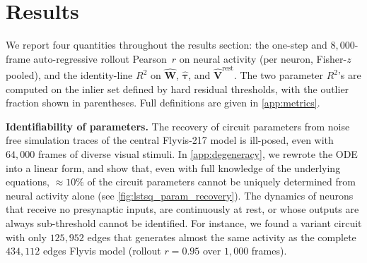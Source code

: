 \documentclass{article}
\begin{document}
\section{Results}



We report four quantities throughout the results section: the one-step and
$8{,}000$-frame auto-regressive rollout Pearson~$r$ on neural activity
(per neuron, Fisher-$z$ pooled), and the identity-line $R^2$ on
$\hat{\mathbf{W}}$, $\hat{\boldsymbol{\tau}}$, and
$\hat{\mathbf{V}}^{\mathrm{rest}}$. The two parameter $R^2$'s are
computed on the inlier set defined by hard residual thresholds, with
the outlier fraction shown in parentheses. Full definitions are given
in \cref{app:metrics}.


\textbf{Identifiability of parameters.}
The recovery of circuit parameters from noise free simulation traces of the central Flyvis-217 model is ill-posed, even with $64{,}000$ frames of diverse visual stimuli. In \cref{app:degeneracy}, we rewrote the ODE into a linear form, and show that, even with full knowledge of the underlying equations, $\approx 10\%$ of the circuit parameters cannot be uniquely determined from neural activity alone (see \cref{fig:lstsq_param_recovery}). The dynamics of neurons that receive no presynaptic inputs, are continuously at rest, or whose outputs are always sub-threshold cannot be identified.
For instance, we found a variant circuit with only $125{,}952$ edges that generates almost the same activity as the complete $434{,}112$ edges Flyvis model (rollout $r = 0.95$ over $1{,}000$ frames).

\end{document}
